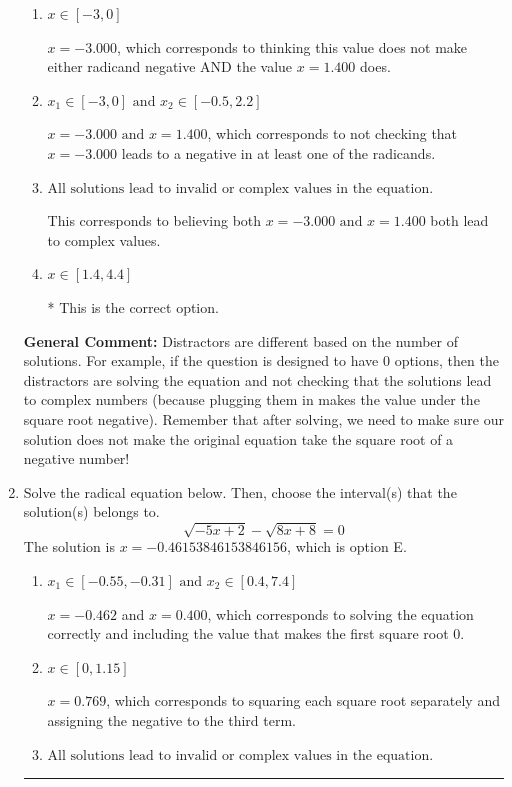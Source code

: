 \documentclass{extbook}[14pt]
\newcommand{\litem}[1]{\item #1

\rule{\textwidth}{0.4pt}}
\begin{document}
\begin{enumerate}
{\begin{enumerate}[label=\Alph*.]
$x = 1.400 \text{ and } x = 3.000$, which corresponds to negatives or the absolute value of the values you would have gotten by solving the equation correctly.
\item \( x \in [-3,0] \)

$x = -3.000$, which corresponds to thinking this value does not make either radicand negative AND the value $x = 1.400$ does.
\item \( x_1 \in [-3, 0] \text{ and } x_2 \in [-0.5,2.2] \)

$x = -3.000 \text{ and } x = 1.400$, which corresponds to not checking that $x = -3.000$ leads to a negative in at least one of the radicands.
\item \( \text{All solutions lead to invalid or complex values in the equation.} \)

This corresponds to believing both $x = -3.000 \text{ and } x = 1.400$ both lead to complex values.
\item \( x \in [1.4,4.4] \)

* This is the correct option.
\end{enumerate}

\textbf{General Comment:} Distractors are different based on the number of solutions. For example, if the question is designed to have 0 options, then the distractors are solving the equation and not checking that the solutions lead to complex numbers (because plugging them in makes the value under the square root negative). Remember that after solving, we need to make sure our solution does not make the original equation take the square root of a negative number!
}
\litem{
Solve the radical equation below. Then, choose the interval(s) that the solution(s) belongs to.
\[ \sqrt{-5 x + 2} - \sqrt{8 x + 8} = 0 \]The solution is \( x = -0.46153846153846156 \), which is option E.\begin{enumerate}[label=\Alph*.]
\item \( x_1 \in [-0.55, -0.31] \text{ and } x_2 \in [0.4,7.4] \)

$x = -0.462$ and $x = 0.400$, which corresponds to solving the equation correctly and including the value that makes the first square root 0.
\item \( x \in [0,1.15] \)

$x = 0.769$, which corresponds to squaring each square root separately and assigning the negative to the third term.
\item \( \text{All solutions lead to invalid or complex values in the equation.} \)


\end{enumerate}}
\end{enumerate}
\end{document}
